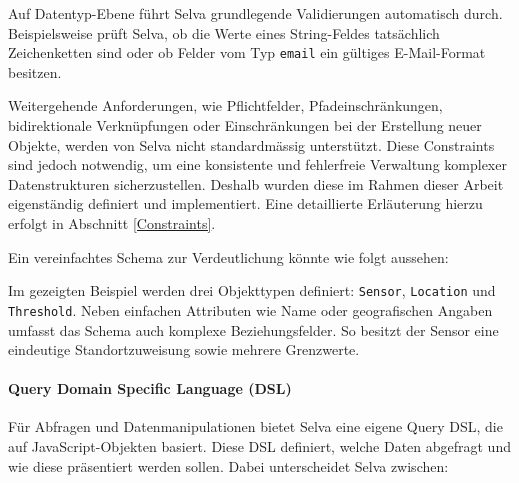 Auf Datentyp-Ebene führt Selva grundlegende Validierungen automatisch durch. Beispielsweise prüft Selva, ob die Werte eines String-Feldes tatsächlich Zeichenketten sind oder ob Felder vom Typ \texttt{email} ein gültiges E-Mail-Format besitzen.

Weitergehende Anforderungen, wie Pflichtfelder, Pfadeinschränkungen, bidirektionale Verknüpfungen oder Einschränkungen bei der Erstellung neuer Objekte, werden von Selva nicht standardmässig unterstützt. Diese Constraints sind jedoch notwendig, um eine konsistente und fehlerfreie Verwaltung komplexer Datenstrukturen sicherzustellen. Deshalb wurden diese im Rahmen dieser Arbeit eigenständig definiert und implementiert. Eine detaillierte Erläuterung hierzu erfolgt in Abschnitt \ref{Constraints}.

\pagebreak

Ein vereinfachtes Schema zur Verdeutlichung könnte wie folgt aussehen:





Im gezeigten Beispiel werden drei Objekttypen definiert: \texttt{Sensor}, \texttt{Location} und \texttt{Threshold}. Neben einfachen Attributen wie Name oder geografischen Angaben umfasst das Schema auch komplexe Beziehungsfelder. So besitzt der Sensor eine eindeutige Standortzuweisung sowie mehrere Grenzwerte.


\paragraph{Query Domain Specific Language (DSL)}
Für Abfragen und Datenmanipulationen bietet Selva eine eigene Query DSL, die auf JavaScript-Objekten basiert. Diese DSL definiert, welche Daten abgefragt und wie diese präsentiert werden sollen. Dabei unterscheidet Selva zwischen:

